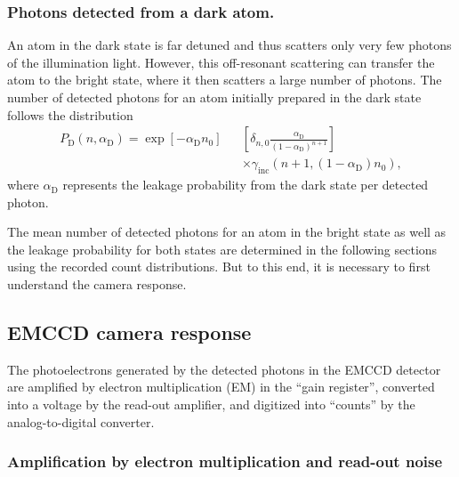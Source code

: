 \documentclass[aps,prl,twocolumn,english,showpacs]{revtex4-1}
\begin{document}
\subsubsection{Photons detected from a dark atom.}

An atom in the dark state is far detuned and thus scatters only very few photons of the illumination light. However, this off-resonant scattering can transfer the atom to the bright state, where it then scatters a large number of photons. The number of detected photons for an atom initially prepared in the dark state follows the distribution \cite{acton2006}
\begin{eqnarray}\label{eq:AtomPhotonDistributionD}
P_{\text{D}}\left( n,\alpha _{\text{D}}\right)=\exp[-\alpha _{\text{D}}n_{0}]&&\left[ \delta _{n,0}\frac{\alpha _{\text{D}}}{(1-\alpha _{\text{D}})^{n+1}}\right]\\
&&\times \gamma_\text{inc} \left( n+1,\left( 1-\alpha_{\text{D}} \right) n_{0}\right), \nonumber
\end{eqnarray}
where $\alpha _{\text{D}}$ represents the leakage probability from the dark state per detected photon. 

The mean number of detected photons for an atom in the bright state as well as the leakage probability for both states are determined in the following sections using the recorded count distributions. But to this end,  it is necessary to first understand the camera response.

\subsection{EMCCD camera response}

The photoelectrons generated by the detected photons in the EMCCD detector are amplified by electron multiplication (EM) in the ``gain register'', converted into a voltage by the read-out amplifier, and digitized into ``counts'' by the analog-to-digital converter.

\subsubsection{Amplification by electron multiplication and read-out noise}
\end{document}
